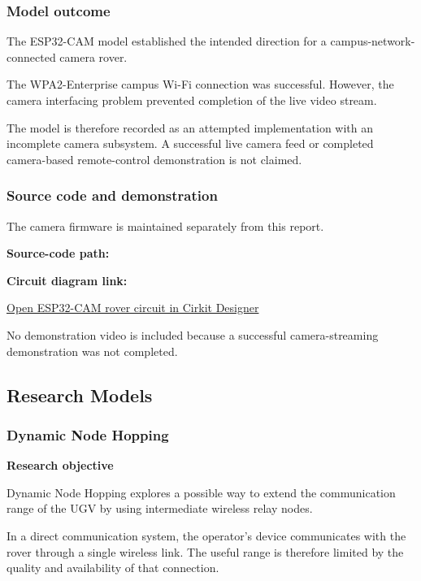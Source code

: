 \documentclass[11pt,a4paper]{article}
\newcommand{\codepath}[1]{%
    \begin{center}
        \fbox{\parbox{0.88\linewidth}{\centering\ttfamily\small\detokenize{#1}}}
    \end{center}%
}
\begin{document}
\subsubsection{Model outcome}

The ESP32-CAM model established the intended
direction for a campus-network-connected
camera rover.

The WPA2-Enterprise campus Wi-Fi connection
was successful. However, the camera interfacing
problem prevented completion of the live video
stream.

The model is therefore recorded as an attempted
implementation with an incomplete camera
subsystem. A successful live camera feed or
completed camera-based remote-control
demonstration is not claimed.


\subsubsection{Source code and demonstration}

The camera firmware is maintained separately
from this report.

\textbf{Source-code path:}

\codepath{codes/esp32_cam/main.ino}

\textbf{Circuit diagram link:}

\href{https://app.cirkitdesigner.com/project/1818aafd-fd66-4861-99ec-7fd3e9db77a6}{Open ESP32-CAM rover circuit in Cirkit Designer}

No demonstration video is included because a successful camera-streaming demonstration was not completed.



\subsection{Research Models}
\label{sec:research-models}

\subsubsection{Dynamic Node Hopping}

\textbf{Research objective}

Dynamic Node Hopping explores a possible way to
extend the communication range of the UGV by
using intermediate wireless relay nodes.

In a direct communication system, the operator's
device communicates with the rover through a
single wireless link. The useful range is
therefore limited by the quality and availability
of that connection.
\end{document}
